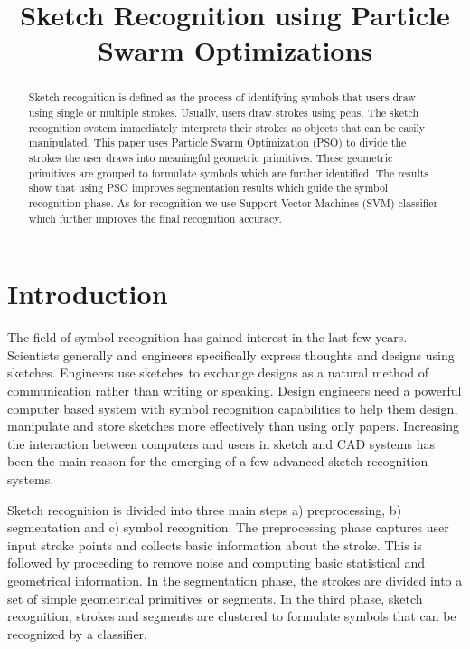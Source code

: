 \documentclass{article}
\title{Sketch Recognition using Particle Swarm Optimizations}
\begin{document}
\maketitle
\begin{abstract}
Sketch recognition is defined as the process of identifying symbols that users draw using single or multiple strokes. Usually, users draw strokes using pens. The sketch recognition system immediately interprets their strokes as objects that can be easily manipulated. This paper uses Particle Swarm Optimization (PSO) to divide the strokes the user draws into meaningful geometric primitives. These geometric primitives are grouped to formulate symbols which are further identified. The results show that using PSO improves segmentation results which guide the symbol recognition phase. As for recognition we use Support Vector Machines (SVM) classifier which further improves the final recognition accuracy.  
\end{abstract}
\section{Introduction}
The field of symbol recognition has gained interest in the last few years. Scientists generally and engineers specifically express thoughts and designs using sketches. Engineers use sketches to exchange designs as a natural method of communication rather than writing or speaking. Design engineers need a powerful computer based system with symbol recognition capabilities to help them design, manipulate and store sketches more effectively than using only papers. Increasing the interaction between computers and users in sketch and CAD systems has been the main reason for the emerging of a few advanced sketch recognition systems. 

Sketch recognition is divided into three main steps a) preprocessing, b) segmentation and c) symbol recognition. The preprocessing phase captures user input stroke points and collects basic information about the stroke. This is followed by proceeding to remove noise and computing basic statistical and geometrical information. In the segmentation phase, the strokes are divided into a set of simple geometrical primitives or segments. In the third phase, sketch recognition, strokes and segments are clustered to formulate symbols that can be recognized by a classifier. 
\end{document}
